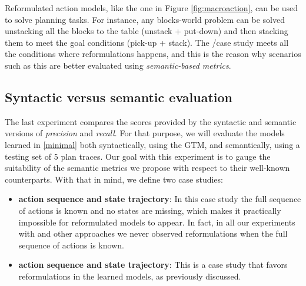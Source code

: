 Reformulated action models, like the one in Figure \ref{fig:macroaction}, can be used to solve planning tasks. For instance, any blocks-world problem can be solved unstacking all the blocks to the table (unstack + put-down) and then stacking them to meet the goal conditions (pick-up + stack). The \NO/\NO case study meets all the conditions where reformulations happens, and this is the reason why scenarios such as this are better evaluated using {\em semantic-based metrics}.


\subsection{Syntactic versus semantic evaluation}

The last experiment compares the scores provided by the syntactic and semantic versions of {\em precision} and {\em recall}. For that purpose, we will evaluate the models learned in \ref{minimal} both syntactically, using the GTM, and semantically, using a testing set of 5 plan traces.  Our goal with this experiment is to gauge the suitability of the semantic metrics we propose with respect to their well-known counterparts. With that in mind, we define two case studies:

\begin{itemize}
	\item \textbf{\FO action sequence and \PO state trajectory}: In this case study the full sequence of actions is known and no states are missing, which makes it practically impossible for reformulated models to appear. In fact, in all our experiments with \FAMA and other approaches we never observed reformulations when the full sequence of actions is known.
	\item  \textbf{\NO action sequence and \NO state trajectory}: This is a case study that favors reformulations in the learned models, as previously discussed.
\end{itemize}

